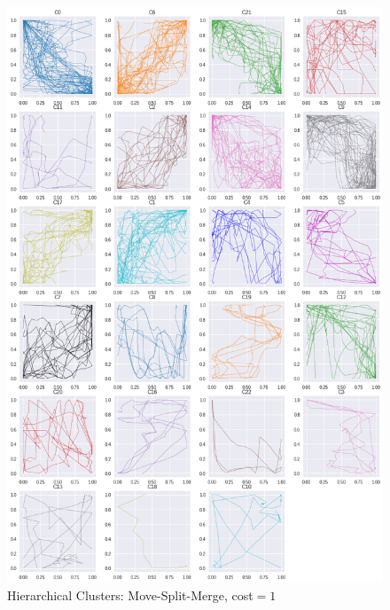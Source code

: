 \begin{figure}[h]
  \centering
  \includegraphics[width=\linewidth,height=\textheight,keepaspectratio]{figs/clusters/CLU_H_ALL[MSM;c=1].png}
  \caption{ Hierarchical Clusters: Move-Split-Merge, cost$=1$}
\end{figure}

